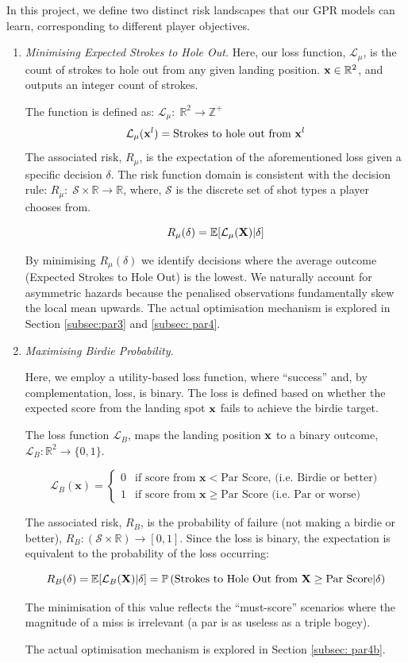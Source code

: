 \documentclass[11pt, letterpaper]{article}
\begin{document}
In this project, we define two distinct risk landscapes that our GPR models can learn, corresponding to different player objectives.
\begin{enumerate}
    \item \textit{Minimising Expected Strokes to Hole Out.} Here, our loss function, $\mathcal{L}_\mu$,  is the count of strokes to hole out from any given landing position. $ \mathbf{x} \in \mathbb{R}^2$, and outputs an integer count of strokes.

    The function is defined as: $\mathcal{L}_{\mu}:\; \mathbb{R}^2 \to \mathbb{Z^+}$
    $$\mathcal{L}_\mu(\mathbf{x}^l)= \text{Strokes to hole out from }\mathbf{x}^l$$
    The associated risk, $R_{\mu}$, is the expectation of the aforementioned loss given a specific decision $\delta$. The risk function domain is consistent with the decision rule:  $R_{\mu}:\; \mathcal{S} \times \mathbb{R}\to \mathbb{R}$, where, $\mathcal{S}$ is the discrete set of shot types a player chooses from.

    $$R_{\mu}(\delta) = \mathbb{E}[\mathcal{L}_\mu(\mathbf{X}) | \delta]$$
    
    By minimising $R_{\mu} (\delta)$ we identify decisions where the average outcome (Expected Strokes to Hole Out) is the lowest. We naturally account for asymmetric hazards because the penalised observations fundamentally skew the local mean upwards. The actual optimisation mechanism is explored in Section \ref{subsec:par3} and \ref{subsec: par4}.

    \item \textit{Maximising Birdie Probability.} 
    
    Here, we employ a utility-based loss function, where ``success'' and, by complementation, loss, is binary. The loss is defined based on whether the expected score from the landing spot $\mathbf{x}$ fails to achieve the birdie target. 

    The loss function $\mathcal{L}_B$, maps the landing position $\mathbf{x}$ to a binary outcome, $\mathcal{L}_B: \mathbb{R}^2 \to \{0,1\}$.

    $$\mathcal{L}_B(\mathbf{x}) = \begin{cases} 0 & \text{if } \text{score from } \mathbf{x} < \text{Par Score, (i.e. Birdie or better)} \\ 1 & \text{if } \text{score from } \mathbf{x} \ge \text{Par Score (i.e. Par or worse)} \end{cases}$$

    The associated risk, $R_B$, is the probability of failure (not making a birdie or better), $R_B: (\mathcal{S} \times \mathbb{R}) \to [0,1]$. Since the loss is binary, the expectation is equivalent to the probability of the loss occurring: 
    
    $$R_B(\delta) = \mathbb{E}[\mathcal{L}_B(\mathbf{X})|\delta] = \mathbb{P}\left(\text{Strokes to Hole Out from } \mathbf{X} \geq \text{Par Score} | \delta \right)$$
    
    The minimisation of this value reflects the ``must-score'' scenarios where the magnitude of a miss is irrelevant (a par is as useless as a triple bogey). 

     The actual optimisation mechanism is explored in Section \ref{subsec: par4b}.
\end{enumerate}
\end{document}
